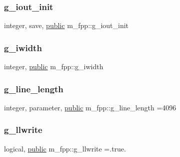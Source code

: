\mbox{\label{namespacem__fpp_ac2149360808b5ac936e0cbfa075c0099}} 
\subsubsection{\texorpdfstring{g\+\_\+iout\+\_\+init}{g\_iout\_init}}
{\footnotesize\ttfamily integer, save, \hyperlink{M__stopwatch_83_8txt_a2f74811300c361e53b430611a7d1769f}{public} m\+\_\+fpp\+::g\+\_\+iout\+\_\+init}

\mbox{\label{namespacem__fpp_a2dcc2372199e7d3cb6e318948cbd77c0}} 
\subsubsection{\texorpdfstring{g\+\_\+iwidth}{g\_iwidth}}
{\footnotesize\ttfamily integer, \hyperlink{M__stopwatch_83_8txt_a2f74811300c361e53b430611a7d1769f}{public} m\+\_\+fpp\+::g\+\_\+iwidth}

\mbox{\label{namespacem__fpp_ab93f8756cf248cf8db932573009d4664}} 
\subsubsection{\texorpdfstring{g\+\_\+line\+\_\+length}{g\_line\_length}}
{\footnotesize\ttfamily integer, parameter, \hyperlink{M__stopwatch_83_8txt_a2f74811300c361e53b430611a7d1769f}{public} m\+\_\+fpp\+::g\+\_\+line\+\_\+length =4096}

\mbox{\label{namespacem__fpp_a5939800574631e8265956e2bc2224a9f}} 
\subsubsection{\texorpdfstring{g\+\_\+llwrite}{g\_llwrite}}
{\footnotesize\ttfamily logical, \hyperlink{M__stopwatch_83_8txt_a2f74811300c361e53b430611a7d1769f}{public} m\+\_\+fpp\+::g\+\_\+llwrite =.true.}

